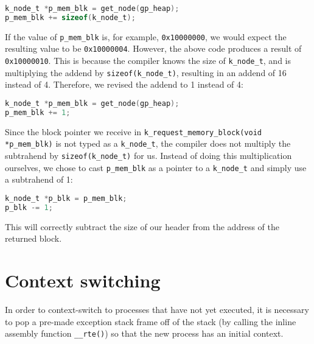 \documentclass[12pt]{report}
\begin{document}
\begin{minipage}{\textwidth}
\begin{lstlisting}[language=C]
k_node_t *p_mem_blk = get_node(gp_heap);
p_mem_blk += sizeof(k_node_t);
\end{lstlisting}
\end{minipage}

If the value of \texttt{p_mem_blk} is, for example, \texttt{0x10000000}, we would expect the resulting value to be \texttt{0x10000004}. However, the above code produces a result of \texttt{0x10000010}. This is because the compiler knows the size of \texttt{k_node_t}, and is multiplying the addend by \texttt{sizeof(k_node_t)}, resulting in an addend of 16 instead of 4. Therefore, we revised the addend to 1 instead of 4:

\begin{minipage}{\textwidth}
\begin{lstlisting}[language=C]
k_node_t *p_mem_blk = get_node(gp_heap);
p_mem_blk += 1;
\end{lstlisting}
\end{minipage}

Since the block pointer we receive in \texttt{k_request_memory_block(void *p_mem_blk)} is not typed as a \texttt{k_node_t}, the compiler does not multiply the subtrahend by \texttt{sizeof(k_node_t)} for us. Instead of doing this multiplication ourselves, we chose to cast \texttt{p_mem_blk} as a pointer to a \texttt{k_node_t} and simply use a subtrahend of 1:

\begin{minipage}{\textwidth}
\begin{lstlisting}[language=C]
k_node_t *p_blk = p_mem_blk;
p_blk -= 1;
\end{lstlisting}
\end{minipage}

This will correctly subtract the size of our header from the address of the returned block.

\section{Context switching}

In order to context-switch to processes that have not yet executed, it is necessary to pop a pre-made exception stack frame off of the stack (by calling the inline assembly function \texttt{__rte()}) so that the new process has an initial context.\\
\end{document}
